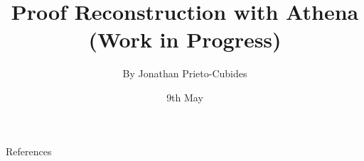 \documentclass[hyperref={pdfpagelabels=false}]{beamer}
\title{Proof Reconstruction with Athena\\(Work in Progress)}
\date{9th May}
\author{By Jonathan Prieto-Cubides}
\institute{
EAFIT University\\
Medell\'in, Colombia
}
\begin{document}
\setcounter{page}{1}
\maketitle

\begin{frame}{References}

\end{frame}
\end{document}
